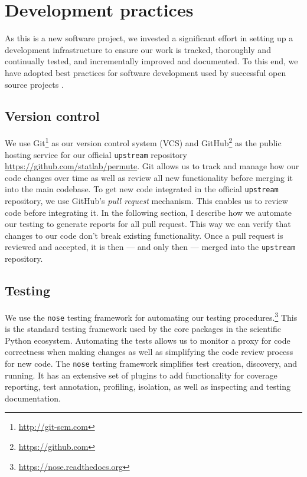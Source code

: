 \chapter{\label{ch:dev}Development practices}

As this is a new software project, we invested a significant effort in setting
up a development infrastructure to ensure our work is tracked,
thoroughly and continually tested, and incrementally improved and documented.
To this end, we have adopted best practices for software development used by
successful open source projects \cite{millman2014}.

\section{\label{sec:vc}Version control}

We use Git\footnote{\url{http://git-scm.com}} as our version control system
(VCS) and GitHub\footnote{\url{https://github.com}} as the public hosting
service for our official \texttt{upstream} repository
\url{https://github.com/statlab/permute}.  Git allows us to track and manage
how our code changes over time as well as review all new functionality before
merging it into the main codebase.  To get new code integrated in the official
\texttt{upstream} repository, we use GitHub's \emph{pull request} mechanism.
This enables us to review code before integrating it.  In the following
section, I describe how we automate our testing to generate reports for all
pull request.  This way we can verify that changes to our code don't break
existing functionality.  Once a pull request is reviewed and accepted, it is
then --- and only then --- merged into the \texttt{upstream} repository.


\section{\label{sec:test}Testing}

We use the \texttt{nose} testing framework for automating our testing
procedures.\footnote{\url{https://nose.readthedocs.org}}  This is the standard
testing framework used by the core packages in the scientific Python ecosystem.
Automating the tests allows us to monitor a proxy for code correctness when
making changes as well as simplifying the code review process for new code. 
The \texttt{nose} testing framework simplifies test creation, discovery,
and running. It has an extensive set of plugins to add functionality
for coverage reporting, test annotation, profiling, isolation, as well
as inspecting and testing documentation.

